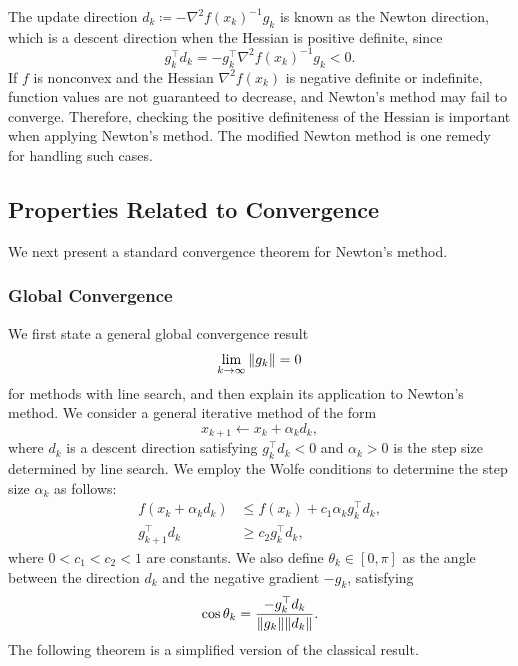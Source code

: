 \documentclass[0_en]{subfiles}
\begin{document}
The update direction $d_k \coloneqq -\nabla^2 f(x_k)^{-1} g_k$ is known as the Newton direction, which is a descent direction when the Hessian is positive definite, since
\begin{equation*}
    g_k^\top d_k = -g_k^\top \nabla^2 f(x_k)^{-1} g_k < 0.
\end{equation*}
If $f$ is nonconvex and the Hessian $\nabla^2 f(x_k)$ is negative definite or indefinite, function values are not guaranteed to decrease, and Newton's method may fail to converge.
Therefore, checking the positive definiteness of the Hessian is important when applying Newton's method.
The modified Newton method \citep[Sec. 3.4]{nocedal1999numerical} is one remedy for handling such cases.

\subsection{Properties Related to Convergence}
\label{sec:newton-local-convergence}

We next present a standard convergence theorem for Newton's method.

\subsubsection{Global Convergence}

We first state a general global convergence result
\begin{equation*}
    \lim_{k \to \infty} \norm{g_k} = 0
\end{equation*}
for methods with line search, and then explain its application to Newton's method.
We consider a general iterative method of the form
\begin{equation*}
    x_{k+1} \gets x_k + \alpha_k d_k,
\end{equation*}
where $d_k$ is a descent direction satisfying $g_k^\top d_k < 0$ and $\alpha_k > 0$ is the step size determined by line search.
We employ the Wolfe conditions \citep[Sec. 3.1]{nocedal1999numerical} to determine the step size $\alpha_k$ as follows:
\begin{align*}
    f(x_k + \alpha_k d_k) & \leq f(x_k) + c_1 \alpha_k g_k^\top d_k, \\
    g_{k+1}^\top d_k      & \geq c_2 g_k^\top d_k,
\end{align*}
where $0 < c_1 < c_2 < 1$ are constants.
We also define $\theta_k \in [0, \pi]$ as the angle between the direction $d_k$ and the negative gradient $-g_k$, satisfying
\begin{equation*}
    \cos \theta_k = \frac{-g_k^\top d_k}{\norm{g_k}\norm{d_k}}.
\end{equation*}
The following theorem is a simplified version of the classical result.
\end{document}
